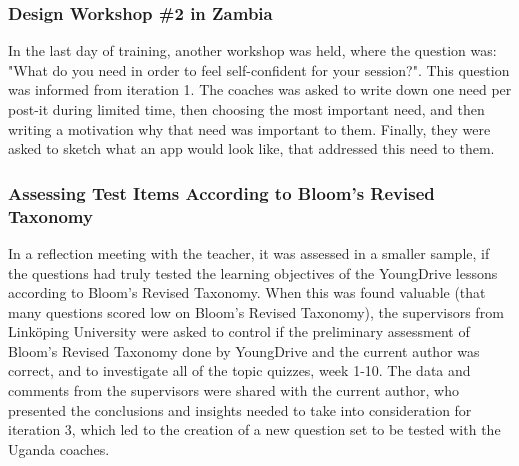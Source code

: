 \subsubsection{Design Workshop \#2 in Zambia}
In the last day of training, another workshop was held, where the question was: "What do you need in order to feel self-confident for your session?". This question was informed from iteration 1. The coaches was asked to write down one need per post-it during limited time, then choosing the most important need, and then writing a motivation why that need was important to them. Finally, they were asked to sketch what an app would look like, that addressed this need to them.

\subsubsection{Assessing Test Items According to Bloom's Revised Taxonomy}
In a reflection meeting with the teacher, it was assessed in a smaller sample, if the questions had truly tested the learning objectives of the YoungDrive lessons according to Bloom's Revised Taxonomy. When this was found valuable (that many questions scored low on Bloom's Revised Taxonomy), the supervisors from Linköping University were asked to control if the preliminary assessment of Bloom's Revised Taxonomy done by YoungDrive and the current author was correct, and to investigate all of the topic quizzes, week 1-10.  The data and comments from the supervisors were shared with the current author, who presented the conclusions and insights needed to take into consideration for iteration 3, which led to the creation of a new question set to be tested with the Uganda coaches.
